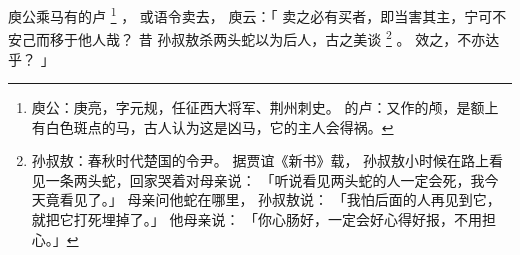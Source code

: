 
\switchcolumn*[\section{}]

庾公乘马有的卢%
\footnote{%
    庾公：庚亮，字元规，任征西大将军、荆州刺史。
    的卢：又作的颅，是额上有白色斑点的马，古人认为这是凶马，它的主人会得祸。
}%
，
或语令卖去，
庾云：「
    卖之必有买者，即当害其主，宁可不安己而移于他人哉？
    昔
    孙叔敖杀两头蛇以为后人，古之美谈%
    \footnote{%
        孙叔敖：春秋时代楚国的令尹。
                据贾谊《新书》载，
                孙叔敖小时候在路上看见一条两头蛇，回家哭着对母亲说：
                「听说看见两头蛇的人一定会死，我今天竟看见了。」
                母亲问他蛇在哪里，
                孙叔敖说：
                「我怕后面的人再见到它，就把它打死埋掉了。」
                他母亲说：
                「你心肠好，一定会好心得好报，不用担心。」
    }%
    。
    效之，不亦达乎？
」

\switchcolumn



